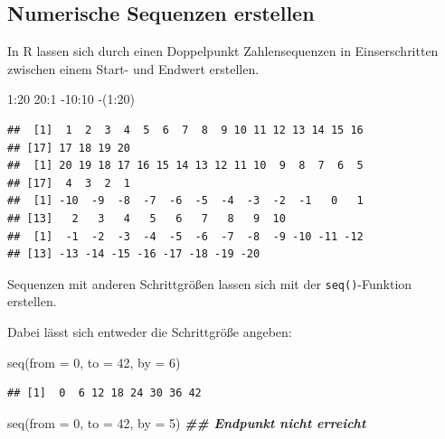 \documentclass[
]{book}
\newenvironment{Shaded}{\begin{snugshade}}{\end{snugshade}}
\newcommand{\AttributeTok}[1]{\textcolor[rgb]{0.77,0.63,0.00}{#1}}
\newcommand{\DecValTok}[1]{\textcolor[rgb]{0.00,0.00,0.81}{#1}}
\newcommand{\DocumentationTok}[1]{\textcolor[rgb]{0.56,0.35,0.01}{\textbf{\textit{#1}}}}
\newcommand{\FunctionTok}[1]{\textcolor[rgb]{0.00,0.00,0.00}{#1}}
\newcommand{\NormalTok}[1]{#1}
\newcommand{\SpecialCharTok}[1]{\textcolor[rgb]{0.00,0.00,0.00}{#1}}
\begin{document}
\hypertarget{numerische-sequenzen-erstellen}{%
\subsection{Numerische Sequenzen erstellen}\label{numerische-sequenzen-erstellen}}

\small

In R lassen sich durch einen Doppelpunkt Zahlensequenzen in Einserschritten zwischen einem Start- und Endwert erstellen.

\begin{Shaded}
\begin{Highlighting}[]
\DecValTok{1}\SpecialCharTok{:}\DecValTok{20} 
\DecValTok{20}\SpecialCharTok{:}\DecValTok{1}
\SpecialCharTok{{-}}\DecValTok{10}\SpecialCharTok{:}\DecValTok{10}
\SpecialCharTok{{-}}\NormalTok{(}\DecValTok{1}\SpecialCharTok{:}\DecValTok{20}\NormalTok{)}
\end{Highlighting}
\end{Shaded}

\begin{verbatim}
##  [1]  1  2  3  4  5  6  7  8  9 10 11 12 13 14 15 16
## [17] 17 18 19 20
##  [1] 20 19 18 17 16 15 14 13 12 11 10  9  8  7  6  5
## [17]  4  3  2  1
##  [1] -10  -9  -8  -7  -6  -5  -4  -3  -2  -1   0   1
## [13]   2   3   4   5   6   7   8   9  10
##  [1]  -1  -2  -3  -4  -5  -6  -7  -8  -9 -10 -11 -12
## [13] -13 -14 -15 -16 -17 -18 -19 -20
\end{verbatim}

Sequenzen mit anderen Schrittgrößen lassen sich mit der \texttt{seq()}-Funktion erstellen.

Dabei lässt sich entweder die Schrittgröße angeben:

\begin{Shaded}
\begin{Highlighting}[]
\FunctionTok{seq}\NormalTok{(}\AttributeTok{from =} \DecValTok{0}\NormalTok{, }\AttributeTok{to =} \DecValTok{42}\NormalTok{, }\AttributeTok{by =} \DecValTok{6}\NormalTok{)}
\end{Highlighting}
\end{Shaded}

\begin{verbatim}
## [1]  0  6 12 18 24 30 36 42
\end{verbatim}

\begin{Shaded}
\begin{Highlighting}[]
\FunctionTok{seq}\NormalTok{(}\AttributeTok{from =} \DecValTok{0}\NormalTok{, }\AttributeTok{to =} \DecValTok{42}\NormalTok{, }\AttributeTok{by =} \DecValTok{5}\NormalTok{) }\DocumentationTok{\#\# Endpunkt nicht erreicht }
\end{Highlighting}
\end{Shaded}
\end{document}
